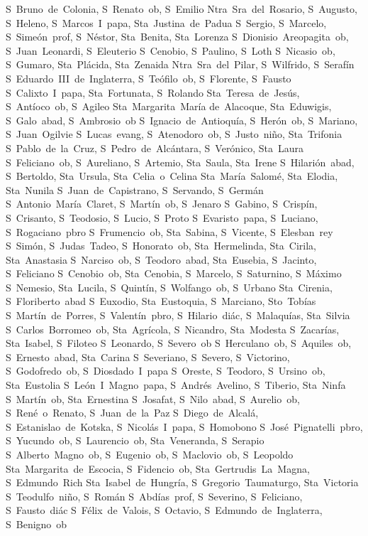 S~Bruno~de~Colonia, S~Renato~ob, S~Emilio
Ntra~Sra~del~Rosario, S~Augusto, S~Heleno, S~Marcos~I~papa, Sta~Justina~de~Padua
S~Sergio, S~Marcelo, S~Sime\'on~prof, S~N\'estor, Sta~Benita, Sta~Lorenza
S~Dionisio~Areopagita~ob, S~Juan~Leonardi, S~Eleuterio
S~Cenobio, S~Paulino, S~Loth
S~Nicasio~ob, S~Gumaro, Sta~Pl\'acida, Sta~Zenaida
Ntra~Sra~del~Pilar, S~Wilfrido, S~Seraf\'in
S~Eduardo~III~de~Inglaterra, S~Te\'ofilo~ob, S~Florente, S~Fausto
S~Calixto~I~papa, Sta~Fortunata, S~Rolando
Sta~Teresa~de~Jes\'us, S~Ant\'ioco~ob, S~Agileo
Sta~Margarita~Mar\'ia de~Alacoque, Sta~Eduwigis, S~Galo~abad, S~Ambrosio~ob
S~Ignacio~de~Antioqu\'ia, S~Her\'on~ob, S~Mariano, S~Juan~Ogilvie
S~Lucas~evang, S~Atenodoro~ob, S~Justo~ni\~no, Sta~Trifonia
S~Pablo~de~la~Cruz, S~Pedro~de~Alc\'antara, S~Ver\'onico, Sta~Laura
S~Feliciano~ob, S~Aureliano, S~Artemio, Sta~Saula, Sta~Irene
S~Hilari\'on~abad, S~Bertoldo, Sta~Ursula, Sta~Celia~o~Celina
Sta~Mar\'ia~Salom\'e, Sta~Elodia, Sta~Nunila
S~Juan~de~Capistrano, S~Servando, S~Germ\'an
S~Antonio~Mar\'ia~Claret, S~Mart\'in~ob, S~Jenaro
S~Gabino, S~Crisp\'in, S~Crisanto, S~Teodosio, S~Lucio, S~Proto
S~Evaristo~papa, S~Luciano, S~Rogaciano~pbro
S~Frumencio~ob, Sta~Sabina, S~Vicente, S~Elesban~rey
S~Sim\'on, S~Judas~Tadeo, S~Honorato~ob, Sta~Hermelinda, Sta~Cirila, Sta~Anastasia
S~Narciso~ob, S~Teodoro~abad, Sta~Eusebia, S~Jacinto, S~Feliciano
S~Cenobio~ob, Sta~Cenobia, S~Marcelo, S~Saturnino, S~M\'aximo
S~Nemesio, Sta~Lucila, S~Quint\'in, S~Wolfango~ob, S~Urbano
Sta~Cirenia, S~Floriberto~abad
S~Euxodio, Sta~Eustoquia, S~Marciano, Sto~Tob\'ias
S~Mart\'in~de~Porres, S~Valent\'in~pbro, S~Hilario~di\'ac, S~Malaqu\'ias, Sta~Silvia
S~Carlos~Borromeo~ob, Sta~Agr\'icola, S~Nicandro, Sta~Modesta
S~Zacar\'ias, Sta~Isabel, S~Filoteo
S~Leonardo, S~Severo~ob
S~Herculano~ob, S~Aquiles~ob, S~Ernesto~abad, Sta~Carina
S~Severiano, S~Severo, S~Victorino, S~Godofredo~ob, S~Diosdado~I~papa
S~Oreste, S~Teodoro, S~Ursino~ob, Sta~Eustolia
S~Le\'on~I~Magno~papa, S~Andr\'es~Avelino, S~Tiberio, Sta~Ninfa
S~Mart\'in~ob, Sta~Ernestina
S~Josafat, S~Nilo~abad, S~Aurelio~ob, S~Ren\'e~o~Renato, S~Juan~de~la~Paz
S~Diego~de~Alcal\'a, S~Estanislao~de~Kotska, S~Nicol\'as~I~papa, S~Homobono
S~Jos\'e~Pignatelli~pbro, S~Yucundo~ob, S~Laurencio~ob, Sta~Veneranda, S~Serapio
S~Alberto~Magno~ob, S~Eugenio~ob, S~Maclovio~ob, S~Leopoldo
Sta~Margarita~de~Escocia, S~Fidencio~ob, Sta~Gertrudis~La~Magna, S~Edmundo~Rich
Sta~Isabel~de~Hungr\'ia, S~Gregorio~Taumaturgo, Sta~Victoria
S~Teodulfo~ni\~no, S~Rom\'an
S~Abd\'ias~prof, S~Severino, S~Feliciano, S~Fausto~di\'ac
S~F\'elix~de~Valois, S~Octavio, S~Edmundo~de~Inglaterra, S~Benigno~ob
